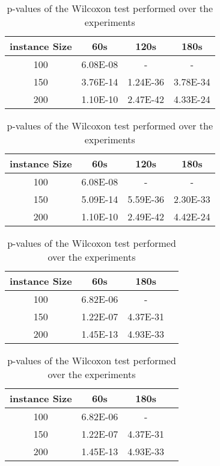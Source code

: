 \begin{table}[H]
\centering
\caption{p-values of the Wilcoxon test performed over the experiments}
\label{tab:wilcoxon}
\begin{tabular}{c ccc}
\toprule
 instance Size &      60s &     120s &     180s \\
\midrule
           100 & 6.08E-08 &        - &        - \\
           150 & 3.76E-14 & 1.24E-36 & 3.78E-34 \\
           200 & 1.10E-10 & 2.47E-42 & 4.33E-24 \\
\bottomrule
\end{tabular}
\end{table}
\begin{table}[H]
\centering
\caption{p-values of the Wilcoxon test performed over the experiments}
\label{tab:wilcoxon}
\begin{tabular}{c ccc}
\toprule
 instance Size &      60s &     120s &     180s \\
\midrule
           100 & 6.08E-08 &        - &        - \\
           150 & 5.09E-14 & 5.59E-36 & 2.30E-33 \\
           200 & 1.10E-10 & 2.49E-42 & 4.42E-24 \\
\bottomrule
\end{tabular}
\end{table}
\begin{table}[H]
\caption{p-values of the Wilcoxon test performed over the experiments}
\label{tab:wilcoxon}
\begin{tabular}{c ccc}
\toprule
instance Size & 60s & 180s \\
\midrule
100 & 6.82E-06 & - \\
150 & 1.22E-07 & 4.37E-31 \\
200 & 1.45E-13 & 4.93E-33 \\
\bottomrule
\end{tabular}
\end{table}
\begin{table}[H]
\caption{p-values of the Wilcoxon test performed over the experiments}
\label{tab:wilcoxon}
\begin{tabular}{c ccc}
\toprule
instance Size & 60s & 180s \\
\midrule
100 & 6.82E-06 & - \\
150 & 1.22E-07 & 4.37E-31 \\
200 & 1.45E-13 & 4.93E-33 \\
\bottomrule
\end{tabular}
\end{table}
